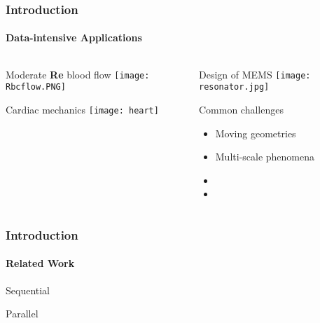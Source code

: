 \begin{frame}	
\frametitle{Introduction }
\framesubtitle{Data-intensive Applications}

\begin{columns}
\begin{column}{.5\textwidth}
 
            \begin{center} Moderate \textbf{Re} blood flow \texttt{[image: Rbcflow.PNG]} \end{center}

  	\begin{center} Cardiac mechanics \texttt{[image: heart]} \end{center}

\end{column}
\begin{column}{.5\textwidth}
    \begin{center}Design of MEMS \texttt{[image: resonator.jpg]} \end{center}
    
\begin{block}{Common challenges}
\begin{itemize}
 \item Moving geometries
 \item Multi-scale phenomena
 \item
 \item
\end{itemize}
\end{block}

\end{column}
\end{columns}
\end{frame}

\begin{frame}
\frametitle{Introduction }
\framesubtitle{Related Work}
\begin{block}{Sequential}

\end{block}

\begin{block}{Parallel}

\end{block}
\end{frame}

